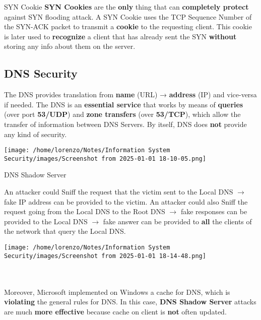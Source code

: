 \begin{quotebox}[colframe=blue!10!white, colback=blue!5!white]{SYN Cookie}
    \textbf{SYN Cookies} are the \textbf{only} thing that can \textbf{completely protect} against SYN flooding attack.
    A SYN Cookie uses the TCP Sequence Number of the SYN-ACK packet to transmit a \textbf{cookie}
    to the requesting client. This cookie is later used to \textbf{recognize} a client that has already sent
    the SYN \textbf{without} storing any info about them on the server.
\end{quotebox}

\subsection{DNS Security}
\begin{minipage}{0.6\textwidth}
\vspace{-0.5cm}
The DNS provides translation from \textbf{name} (URL) → \textbf{address} (IP) and vice-versa if needed.
The DNS is an \textbf{essential service} that works by means of \textbf{queries} (over port \textbf{53/UDP}) and
\textbf{zone transfers} (over \textbf{53/TCP}), which allow the transfer of information between DNS Servers.
By itself, DNS does \textbf{not} provide any kind of security.
\end{minipage} 
\hspace{0.5cm}
\begin{minipage}{0.4\textwidth}
    \centering
    \texttt{[image: /home/lorenzo/Notes/Information System Security/images/Screenshot from 2025-01-01 18-10-05.png]}
\end{minipage}
\begin{center}
    
\begin{quotebox-grey}{DNS Shadow Server}
    \begin{minipage}{0.6\textwidth}
    	\vspace{-0.5cm}
    An attacker could Sniff the request that the victim sent to the Local DNS \(\rightarrow \) fake IP address
    can be provided to the victim. An attacker could also Sniff the request going from the Local
    DNS to the Root DNS \(\rightarrow \) fake responses can be provided to the Local DNS \(\rightarrow \) fake answer
    can be provided to \textbf{all} the clients of the network that query the Local DNS.
    \end{minipage} 
    \hspace{0.3cm}
    \begin{minipage}{0.4\textwidth}
        \centering
        \texttt{[image: /home/lorenzo/Notes/Information System Security/images/Screenshot from 2025-01-01 18-14-48.png]}
    \end{minipage}
    \\   \\
    Moreover, Microsoft implemented on Windows a cache for DNS, which is \textbf{violating} the general
rules for DNS. In this case, \textbf{DNS Shadow Server} attacks are much \textbf{more effective} because cache on client is \textbf{not} often updated.
\end{quotebox-grey}
\end{center}



